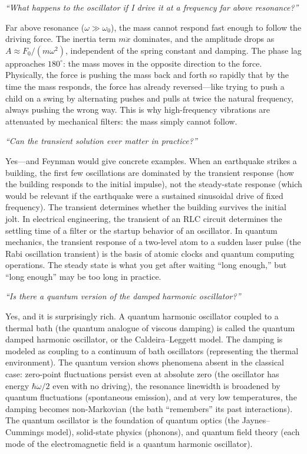 \documentclass[11pt,openright]{book}
\begin{document}
\textit{``What happens to the oscillator if I drive it at a frequency far above resonance?''}

Far above resonance ($\omega \gg \omega_0$), the mass cannot respond fast enough to follow the driving force. The inertia term $m\ddot{x}$ dominates, and the amplitude drops as $A \approx F_0/(m\omega^2)$, independent of the spring constant and damping. The phase lag approaches $180^\circ$: the mass moves in the opposite direction to the force. Physically, the force is pushing the mass back and forth so rapidly that by the time the mass responds, the force has already reversed---like trying to push a child on a swing by alternating pushes and pulls at twice the natural frequency, always pushing the wrong way. This is why high-frequency vibrations are attenuated by mechanical filters: the mass simply cannot follow.

\textit{``Can the transient solution ever matter in practice?''}

Yes---and Feynman would give concrete examples. When an earthquake strikes a building, the first few oscillations are dominated by the transient response (how the building responds to the initial impulse), not the steady-state response (which would be relevant if the earthquake were a sustained sinusoidal drive of fixed frequency). The transient determines whether the building survives the initial jolt. In electrical engineering, the transient of an RLC circuit determines the settling time of a filter or the startup behavior of an oscillator. In quantum mechanics, the transient response of a two-level atom to a sudden laser pulse (the Rabi oscillation transient) is the basis of atomic clocks and quantum computing operations. The steady state is what you get after waiting ``long enough,'' but ``long enough'' may be too long in practice.

\textit{``Is there a quantum version of the damped harmonic oscillator?''}

Yes, and it is surprisingly rich. A quantum harmonic oscillator coupled to a thermal bath (the quantum analogue of viscous damping) is called the quantum damped harmonic oscillator, or the Caldeira--Leggett model. The damping is modeled as coupling to a continuum of bath oscillators (representing the thermal environment). The quantum version shows phenomena absent in the classical case: zero-point fluctuations persist even at absolute zero (the oscillator has energy $\hbar\omega/2$ even with no driving), the resonance linewidth is broadened by quantum fluctuations (spontaneous emission), and at very low temperatures, the damping becomes non-Markovian (the bath ``remembers'' its past interactions). The quantum oscillator is the foundation of quantum optics (the Jaynes--Cummings model), solid-state physics (phonons), and quantum field theory (each mode of the electromagnetic field is a quantum harmonic oscillator).
\end{document}
